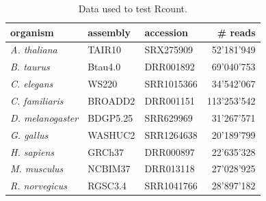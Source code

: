 \documentclass[a4paper,10pt]{article}
\begin{document}
\begin{table}[!h]
\centering
\caption{Data used to test Rcount.}\label{testData}
\vspace{8pt}
\begin{tabular}{l l l r}
\hline
organism&assembly&accession&\# reads\\
\hline
\textit{A. thaliana}	&TAIR10		&SRX275909\cite{2013_Loraine}		&52'181'949	\\
\textit{B. taurus}	&Btau4.0	&DRR001892\cite{2013_Takeo}		&69'040'753	\\
\textit{C. elegans}	&WS220		&SRR1015366\cite{2014_Washburn}		&34'542'067	\\
\textit{C. familiaris}	&BROADD2	&DRR001151		&113'253'542	\\
\textit{D. melanogaster}&BDGP5.25	&SRR629969\cite{2013_Ramaswami}		&31'267'571	\\
\textit{G. gallus}	&WASHUC2	&SRR1264638\cite{2014_Ku}		&20'189'799	\\
\textit{H. sapiens}	&GRCh37		&DRR000897\cite{2011_Odawara}		&22'635'328	\\
\textit{M. musculus}	&NCBIM37	&DRR013118\cite{2014_Yukawa}		&27'028'925	\\
\textit{R. norvegicus}	&RGSC3.4	&SRR1041766\cite{2014_Cortez}		&28'897'182	\\
\hline
\end{tabular}
\end{table}
\end{document}

